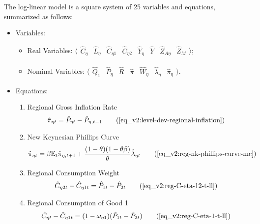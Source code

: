 \documentclass[../thesis.tex]{subfiles}
\begin{document}
The log-linear model is a square system of 25 variables and equations, summarized as follows:

{\singlespacing

\begin{itemize}
	
	\item Variables:
	
	\begin{itemize}
		
		\item Real Variables: $\langle \begin{matrix} \hat{C}_{\eta } & \hat{L}_{\eta } & \hat{C}_{\eta 1} & \hat{C}_{\eta 2} & \hat{Y}_{\eta } & \hat{Y}_{} & \hat{Z}_{A\eta } & \hat{Z}_{M} \end{matrix} \rangle$;
	
		\item Nominal Variables: $\langle \begin{matrix} \hat{Q}_{1} & \hat{P}_{\eta } & \hat{R}_{} & \hat{\pi}_{} & \hat{W}_{\eta } & \hat{\lambda}_{\eta } & \hat{\pi}_{\eta } \end{matrix} \rangle$.
		
	\end{itemize}

	\item Equations:
	
	\begin{enumerate}
		
		\item Regional Gross Inflation Rate
		\begin{align}
			\hat{\pi}_{\eta t} &= \hat{P}_{\eta t} - \hat{P}_{\eta, t-1} \tag{\ref{eq_v2:level-dev-regional-inflation}}
		\end{align}
		
		\item New Keynesian Phillips Curve
		\begin{align}
			\hat{\pi}_{\eta t} &= \beta \E \hat{\pi}_{\eta, t+1} + \frac{(1-\theta) (1- \theta \beta)}{\theta} \hat{\lambda}_{\eta t} \tag{\ref{eq_v2:reg-nk-phillips-curve-mc}}
		\end{align}
		
		\item Regional Consumption Weight
		\begin{align}
			\hat{C}_{\eta 2t} - \hat{C}_{\eta 1t} &= \hat{P}_{1t} - \hat{P}_{2t} \tag{\ref{eq_v2:reg-C-eta-12-t-ll}}
		\end{align}
		
		\item Regional Consumption of Good 1
		\begin{align}
			\hat{C}_{\eta t} - \hat{C}_{\eta 1 t} &= (1 - \omega_{\eta 1}) (\hat{P}_{1t} - \hat{P}_{2t}) \tag{\ref{eq_v2:reg-C-eta-1-t-ll}}
		\end{align}
		

\end{enumerate}
\end{itemize}}
\end{document}
